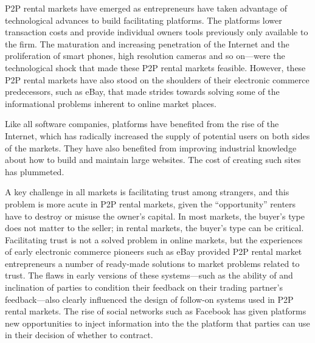 \documentclass[11pt]{article}
\begin{document}
P2P rental markets have emerged as entrepreneurs have taken advantage of technological advances to build facilitating platforms. 
The platforms lower transaction costs and provide individual owners tools previously only available to the firm. 
The maturation and increasing penetration of the Internet and the proliferation of smart phones, high resolution cameras and so on---were the technological shock that made these P2P rental markets feasible. 
However, these P2P rental markets have also stood on the shoulders of their electronic commerce predecessors, such as eBay, that made strides towards solving some of the informational problems inherent to online market places. 

Like all software companies, platforms have benefited from the rise of the Internet, which has radically increased the supply of potential users on both sides of the markets. 
They have also benefited from improving industrial knowledge about how to build and maintain large websites.
The cost of creating such sites has plummeted. 

A key challenge in all markets is facilitating trust among strangers, and this problem is more acute in P2P rental markets, given the ``opportunity'' renters have to destroy or misuse the owner's capital.
In most markets, the buyer's type does not matter to the seller; in rental markets, the buyer's type can be critical. 
Facilitating trust is not a solved problem in online markets, but the experiences of early electronic commerce pioneers such as eBay provided P2P rental market entrepreneurs a number of ready-made solutions to market problems related to trust. 
The flaws in early versions of these systems---such as the ability of and inclination of parties to condition their feedback on their trading partner's feedback---also clearly influenced the design of follow-on systems used in P2P rental markets. 
The rise of social networks such as Facebook has given platforms new opportunities to inject information into the the platform that parties can use in their decision of whether to contract. 
\end{document}
